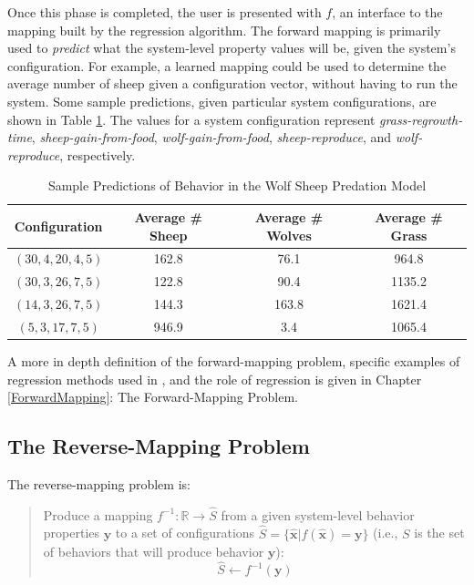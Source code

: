 Once this phase is completed, the user is presented with $f$, an interface to the mapping built by the regression algorithm.
The forward mapping is primarily used to \textit{predict} what the system-level property values will be, given the system's configuration.
For example, a learned mapping could be used to determine the average number of sheep given a configuration vector, without having to run the system.
Some sample predictions, given particular system configurations, are shown in Table \ref{table:ws_predictions}.
The values for a system configuration represent \textit{grass-regrowth-time}, \textit{sheep-gain-from-food}, \textit{wolf-gain-from-food}, \textit{sheep-reproduce}, and \textit{wolf-reproduce}, respectively.

\begin{table}[ht]
  \caption{Sample Predictions of Behavior in the Wolf Sheep Predation Model}
  \centering
  \begin{tabular}{c c c c}
    \hline \hline
    Configuration & Average \# Sheep & Average \# Wolves & Average \# Grass \\
    \hline
    $(30, 4, 20, 4, 5)$ & 162.8 & 76.1 & 964.8 \\
    $(30, 3, 26, 7, 5)$ & 122.8 & 90.4 & 1135.2 \\
    $(14, 3, 26, 7, 5)$ & 144.3 & 163.8 & 1621.4 \\
    $(5, 3, 17, 7, 5)$ & 946.9 & 3.4 & 1065.4 \\
    \hline
  \end{tabular}
  \label{table:ws_predictions}
\end{table}


A more in depth definition of the forward-mapping problem, specific examples of regression methods used in \fw, and the role of regression is given in Chapter \ref{ForwardMapping}: The Forward-Mapping Problem.


\subsection{The Reverse-Mapping Problem}

The reverse-mapping problem is:
\begin{quote}
Produce a mapping $ f^{-1}: \mathbb{R} \rightarrow \hat S$ from a given system-level behavior properties $\mathbf y$ to a set of
configurations $ \hat S = \{ \mathbf {\hat x} | f( \mathbf {\hat x}) = \mathbf y \}$
(i.e., $S$ is the set of behaviors that will produce behavior $\mathbf y$):
\[\hat S \leftarrow f^{-1}(\mathbf y) \]
\end{quote}


